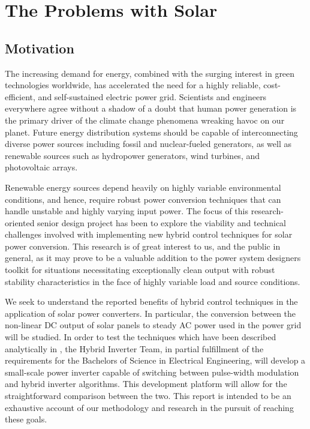 
\chapter{The Problems with Solar} %

\label{Chapter1} %


\section{Motivation}
The increasing demand for energy, combined with the surging interest in green technologies worldwide, has accelerated the need for a highly reliable, cost-efficient, and self-sustained electric power grid. Scientists and engineers everywhere agree without a shadow of a doubt that human power generation is the primary driver of the climate change phenomena wreaking havoc on our planet. Future energy distribution systems should be capable of interconnecting diverse power sources including fossil and nuclear-fueled generators, as well as renewable sources such as hydropower generators, wind turbines, and photovoltaic arrays. 

Renewable energy sources depend heavily on highly variable environmental conditions, and hence, require robust power conversion techniques that can handle unstable and highly varying input power\cite{ricardo}. The focus of this research-oriented senior design project has been to explore the viability and technical challenges involved with implementing new hybrid control techniques for solar power conversion. This research is of great interest to us, and the public in general, as it may prove to be a valuable addition to the power system designers toolkit for situations necessitating exceptionally clean output with robust stability characteristics in the face of highly variable load and source conditions.

We seek to understand the reported benefits of hybrid control techniques in the application of solar power converters. In particular, the conversion between the non-linear DC output of solar panels to steady AC power used in the power grid will be studied. In order to test the techniques which have been described analytically in \cite{ricardo}, the Hybrid Inverter Team, in partial fulfillment of the requirements for the Bachelors of Science in Electrical Engineering, will develop a small-scale power inverter capable of switching between pulse-width modulation and hybrid inverter algorithms. This development platform will allow for the straightforward comparison between the two. This report is intended to be an exhaustive account of our methodology and research in the pursuit of reaching these goals.

